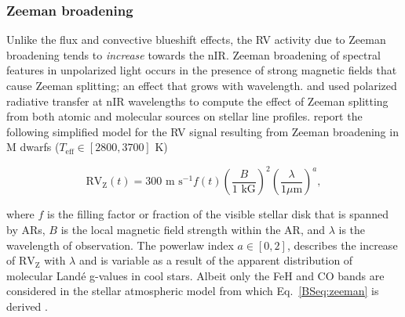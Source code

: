 \subsubsection{Zeeman broadening}
Unlike the flux and convective blueshift effects, the RV activity due to Zeeman broadening tends to
\emph{increase} towards the nIR. Zeeman broadening of spectral features in unpolarized light occurs in
the presence of strong magnetic
fields that cause Zeeman splitting; an effect that grows with wavelength. \cite{reiners13} and
\cite{hebrard14} used polarized
radiative transfer at nIR wavelengths to compute the effect of Zeeman splitting from both atomic and
molecular sources on stellar line profiles. \cite{reiners13} report the following simplified model for the
RV signal resulting from Zeeman broadening in M dwarfs ($T_{\text{eff}} \in [2800, 3700]$ K)

\begin{equation}
  \text{RV}_{\text{Z}}(t) = 300 \text{ m s}^{-1} f(t) \left( \frac{B}{\text{1 kG}} \right)^2
  \left( \frac{\lambda}{1 \mu\text{m}} \right)^a, \label{BSeq:zeeman}
\end{equation}

\noindent where $f$ is the filling factor or fraction of the visible stellar disk that is
spanned by ARs, $B$
is the local magnetic field strength within the AR, and $\lambda$ is the wavelength of
observation. The powerlaw index $a \in [0,2]$, describes the increase of $\text{RV}_{\text{Z}}$ with
$\lambda$ and is variable as a result of the apparent distribution of molecular Land\'{e} g-values
in cool stars. Albeit only the FeH and CO bands are considered in the stellar atmospheric model from
which Eq.~\ref{BSeq:zeeman} is derived \citep{reiners13}. \\


